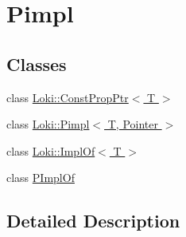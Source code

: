 \hypertarget{group__PimplGroup}{}\section{Pimpl}
\label{group__PimplGroup}
\subsection*{Classes}
\begin{DoxyCompactItemize}
\item 
class \hyperlink{structLoki_1_1ConstPropPtr}{Loki\+::\+Const\+Prop\+Ptr$<$ T $>$}
\item 
class \hyperlink{classLoki_1_1Pimpl}{Loki\+::\+Pimpl$<$ T, Pointer $>$}
\item 
class \hyperlink{structLoki_1_1ImplOf}{Loki\+::\+Impl\+Of$<$ T $>$}
\item 
class \hyperlink{classPImplOf}{P\+Impl\+Of}
\end{DoxyCompactItemize}


\subsection{Detailed Description}
